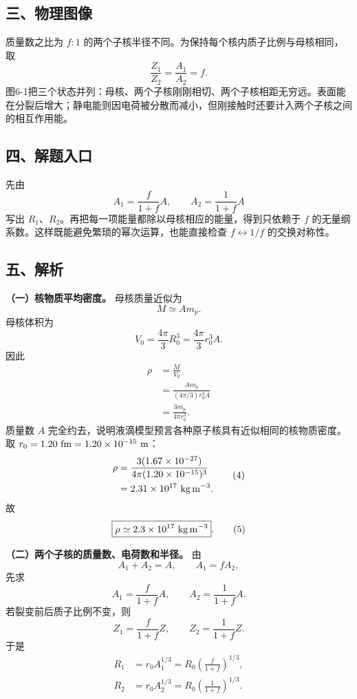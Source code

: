 \documentclass[12pt,a4paper,UTF8]{ctexart}
\begin{document}
\subsection{三、物理图像}\label{ux4e09ux7269ux7406ux56feux50cf-5}

质量数之比为 \(f:1\)
的两个子核半径不同。为保持每个核内质子比例与母核相同，取 \[
\frac{Z_1}{Z_2}=\frac{A_1}{A_2}=f.
\]
图6-1把三个状态并列：母核、两个子核刚刚相切、两个子核相距无穷远。表面能在分裂后增大；静电能则因电荷被分散而减小，但刚接触时还要计入两个子核之间的相互作用能。

\subsection{四、解题入口}\label{ux56dbux89e3ux9898ux5165ux53e3-5}

先由 \[
A_1=\frac{f}{1+f}A,
\qquad
A_2=\frac{1}{1+f}A
\] 写出
\(R_1\)、\(R_2\)。再把每一项能量都除以母核相应的能量，得到只依赖于 \(f\)
的无量纲系数。这样既能避免繁琐的幂次运算，也能直接检查
\(f\leftrightarrow1/f\) 的交换对称性。

\subsection{五、解析}\label{ux4e94ux89e3ux6790-5}

\textbf{（一）核物质平均密度。} 母核质量近似为 \[
M\simeq A m_p. \tag{1}
\] 母核体积为 \[
V_0=\frac{4\pi}{3}R_0^3
=\frac{4\pi}{3}r_0^3A. \tag{2}
\] 因此 \[
\begin{aligned}
\rho
&=\frac{M}{V_0}\\
&=\frac{A m_p}{(4\pi/3)r_0^3A}\\
&=\frac{3m_p}{4\pi r_0^3}.
\end{aligned} \tag{3}
\] 质量数 \(A\)
完全约去，说明液滴模型预言各种原子核具有近似相同的核物质密度。取
\(r_0=1.20\ {\rm fm}=1.20\times10^{-15}\ {\rm m}\)： \[
\begin{aligned}
\rho
&=\frac{3(1.67\times10^{-27})}
{4\pi(1.20\times10^{-15})^3}\\
&=2.31\times10^{17}\ {\rm kg\,m^{-3}}.
\end{aligned} \tag{4}
\] 故 \[
\boxed{\rho\simeq2.3\times10^{17}\ {\rm kg\,m^{-3}}}. \tag{5}
\]

\textbf{（二）两个子核的质量数、电荷数和半径。} 由 \[
A_1+A_2=A,\qquad A_1=fA_2,
\] 先求 \[
\boxed{
A_1=\frac{f}{1+f}A,\qquad
A_2=\frac{1}{1+f}A
}. \tag{6}
\] 若裂变前后质子比例不变，则 \[
\boxed{
Z_1=\frac{f}{1+f}Z,\qquad
Z_2=\frac{1}{1+f}Z
}. \tag{7}
\] 于是 \[
\begin{aligned}
R_1
&=r_0A_1^{1/3}
=R_0\left(\frac{f}{1+f}\right)^{1/3},\\
R_2
&=r_0A_2^{1/3}
=R_0\left(\frac{1}{1+f}\right)^{1/3}.
\end{aligned} \tag{8}
\]
\end{document}
